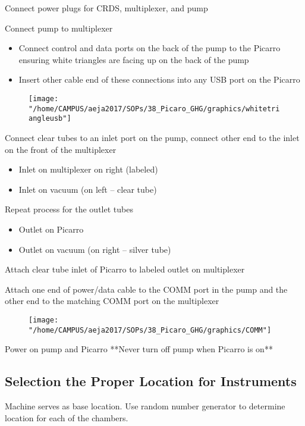 \documentclass[12pt]{../SOP3}\usepackage[]{graphicx}\usepackage[]{color}
\begin{document}
\NP Connect power plugs for CRDS, multiplexer, and pump

\NP Connect pump to multiplexer
\begin{itemize}
\item Connect control and data ports on the back of the pump to the Picarro ensuring white triangles are facing up on the back of the pump
\item Insert other cable end of these connections into any USB port on the Picarro
\end{itemize}

\begin{figure}
\texttt{[image: "/home/CAMPUS/aeja2017/SOPs/38\_Picaro\_GHG/graphics/whitetriangleusb"]}
\end{figure}

\NP Connect clear tubes to an inlet port on the pump, connect other end to the inlet on the front of the multiplexer
\begin{itemize}
\item Inlet on multiplexer on right (labeled)
\item Inlet on vacuum (on left -- clear tube)
\end{itemize}



\NP Repeat process for the outlet tubes
\begin{itemize}
\item Outlet on Picarro
\item Outlet on vacuum (on right -- silver tube)
\end{itemize}

\NP Attach clear tube inlet of Picarro to labeled outlet on multiplexer

\NP Attach one end of power/data cable to the COMM port in the pump and the other end to the matching COMM port on the multiplexer

\begin{figure}
\texttt{[image: "/home/CAMPUS/aeja2017/SOPs/38\_Picaro\_GHG/graphics/COMM"]}
\end{figure}

\NP Power on pump and Picarro **Never turn off pump when Picarro is on**

\subsection*{Selection the Proper Location for Instruments}

\NP Machine serves as base location.
\NP Use random number generator to determine location for each of the chambers.
\end{document}
